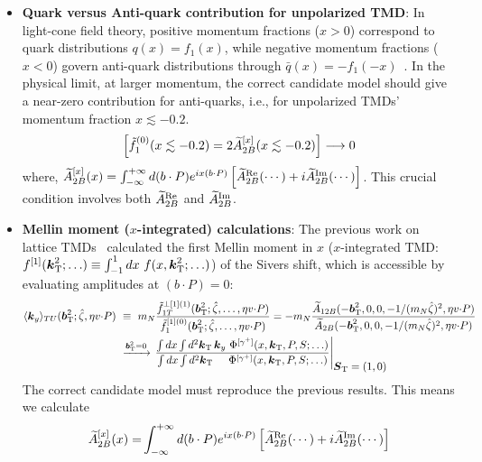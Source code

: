 \begin{itemize}
    \item \textbf{Quark versus Anti-quark contribution for unpolarized TMD}: In light-cone field theory, positive momentum fractions ($x > 0$) correspond to quark distributions $q(x) = f_1(x)$, while negative momentum fractions ($x < 0$) govern anti-quark distributions through $\bar{q}(x) = -f_1(-x)$~\cite{Musch:2011er}. In the physical limit, at larger momentum, the correct candidate model should give a near-zero contribution for anti-quarks, i.e., for unpolarized TMDs' momentum fraction $x\lesssim-0.2$.
    \begin{align}
        \left[\tilde{f}^{(0)}_{1}(x\lesssim-0.2)=2\widetilde{A}^{[x]}_{2B}(x\lesssim-0.2)\right]\longrightarrow0
    \end{align}
    where, $\widetilde{A}^{[x]}_{2B}(x)=\int_{-\infty}^{+\infty} d(b\cdot P)e^{ix(b\cdot P)} \left[\widetilde{A}_{2B}^{\text{Re}}(\cdots)+i\widetilde{A}_{2B}^{\text{Im}}(\cdots)\right]$. This crucial condition involves both $\widetilde{A}_{2B}^{\text{Re}}$ and $\widetilde{A}_{2B}^{\text{Im}}$. 
    \item \textbf{Mellin moment ($x$-integrated) calculations}: The previous work on lattice TMDs~\cite{Musch:2011er, Yoon:2015ocs, Yoon:2017qzo} calculated the first Mellin moment in $x$ ($x$-integrated TMD: $f^{[1]}(\boldsymbol{k}_{\mathrm T}^2;\ldots) \equiv \int_{-1}^1 dx\ f(x,\boldsymbol{k}_{\mathrm T}^2;\ldots)$) of the Sivers shift, which is accessible by evaluating amplitudes at $(b\cdot P)=0$:
    \begingroup\footnotesize
\begin{align}
        \langle \vect{k}_y \rangle_{TU}(\vprp{\bvec}^2;\zetahat,\eta v \tcdot P) 
	&\ \equiv\ \mN \frac{\tilde f_{1T}^{\perp[1](1)}(\vprp{\bvec}^2;\zetahat,\ldots,\eta v \tcdot P)}{\tilde f_1^{[1](0)}(\vprp{\bvec}^2;\zetahat,\ldots,\eta v \tcdot P)}  
	= - \mN \frac{\widetilde{A}_{12B}(-\vprp{\bvec}^2,0,0,-1/(\mN\zetahat)^2,\eta v\tcdot P) }{ \widetilde{A}_{2B}(-\vprp{\bvec}^2,0,0,-1/(\mN\zetahat)^2,\eta v\tcdot P) } \nonumber \\
	&\ \xrightarrow{\vprp{\bvec}^2 = 0} 
		\left. \frac{ \int dx \int d^2 \vprp{\kei}\, \vect{\kei}_y  \ \Phi^{[\gamma^+]}(x,\vprp{\kei},P,S;\ldots) }
		{ \int dx \int d^2 \vprp{\kei}  \phantom{\vect{\kei}_y}\ \Phi^{[\gamma^+]}(x,\vprp{\kei},P,S;\ldots) } \right|_{\displaystyle \vprp{S}=(1,0) } 
	\label{eq-genSivShift-x-moment}
    \end{align}
\endgroup
    The correct candidate model must reproduce the previous results. This means we calculate
    \begin{align}
        \tAmp^{[x]}_{2B}(x)=&\int_{-\infty}^{+\infty} d(b\cdot P)e^{ix(b\cdot P)} \left[\tAmp_{2B}^{\text{Re}}(\cdots)+i\tAmp_{2B}^{\text{Im}}(\cdots)\right]\\

\end{align}
\end{itemize}
